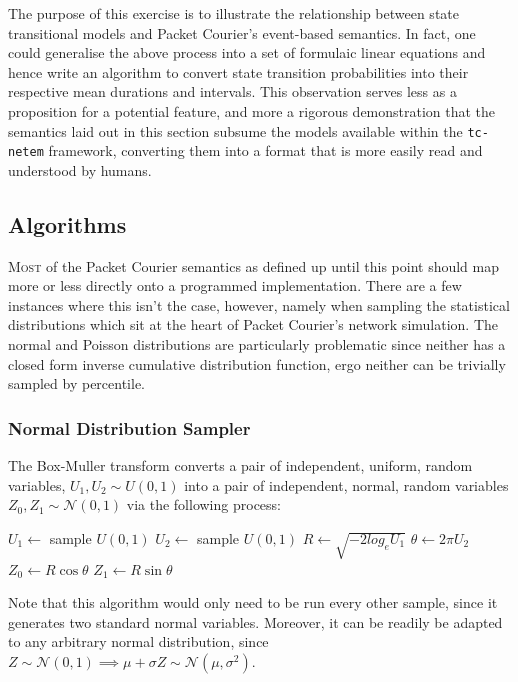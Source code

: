 The purpose of this exercise is to illustrate the relationship between state transitional models and Packet Courier's
event-based semantics. In fact, one could generalise the above process into a set of formulaic linear equations and
hence write an algorithm to convert state transition probabilities into their respective mean durations and
intervals. This observation serves less as a proposition for a potential feature, and more a rigorous demonstration
that the semantics laid out in this section subsume the models available within the \texttt{tc-netem} framework,
converting them into a format that is more easily read and understood by humans.

\newpage

\subsection{Algorithms}

\lettrine{M}{ost} of the Packet Courier semantics as defined up until this point should map more or less directly onto a
programmed implementation. There are a few instances where this isn't the case, however, namely when sampling the
statistical distributions which sit at the heart of Packet Courier's network simulation. The normal and Poisson
distributions are particularly problematic since neither has a closed form inverse cumulative distribution function,
ergo neither can be trivially sampled by percentile.

\subsubsection{Normal Distribution Sampler}

The Box-Muller transform converts a pair of independent, uniform, random variables, $U_1, U_2 \sim U(0, 1)$ into a pair
of independent, normal, random variables $Z_0, Z_1 \sim \mathcal{N}(0, 1)$\cite{box_muller_transform} via the
following process:

\begin{algorithm}[caption={Box-Muller Transform\cite{box_muller_transform}.},label={alg:box_muller_transform},
    captionpos=b]
    $U_1 \gets$ sample $U(0, 1)$
    $U_2 \gets$ sample $U(0, 1)$
    $R \gets \sqrt{-2 log_e U_1}$
    $\theta \gets 2 \pi U_2$
    $Z_0 \gets R \cos \theta$
    $Z_1 \gets R \sin \theta$
\end{algorithm}

Note that this algorithm would only need to be run every other sample, since it generates two standard normal
variables. Moreover, it can be readily be adapted to any arbitrary normal distribution, since $Z \sim \mathcal{N}(0,
1) \implies \mu + \sigma Z \sim \mathcal{N}(\mu, \sigma^2)$.

